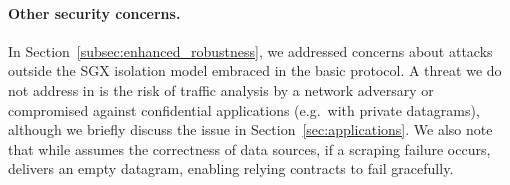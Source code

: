 \paragraph{Other security concerns.} In Section~\ref{subsec:enhanced_robustness}, we addressed concerns about attacks outside the SGX isolation model embraced in the basic \tc protocol. A threat we do not address in \tc is the risk of traffic analysis by a network adversary or compromised \medname against confidential applications (e.g.~with private datagrams), although we briefly discuss the issue in Section~\ref{sec:applications}. We also note that while \tc assumes the correctness of data sources, if a scraping failure occurs, \tc delivers an empty datagram, enabling relying contracts to fail gracefully.
